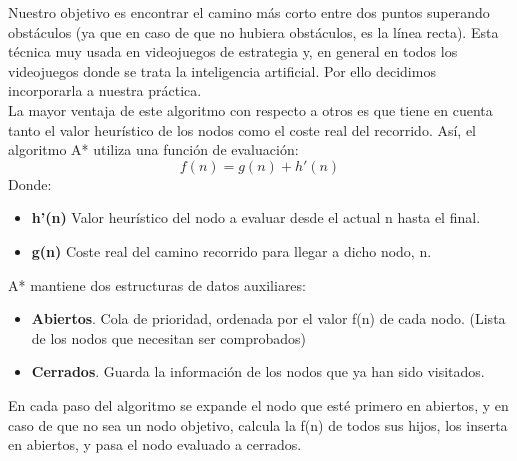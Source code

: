\documentclass[a4paper,12pt,oneside]{book}
\begin{document}
Nuestro objetivo es encontrar el camino más corto entre dos puntos
superando obstáculos (ya que en caso de que no hubiera obstáculos, es la
línea recta). Esta técnica muy usada en videojuegos de
estrategia y, en general en todos los videojuegos donde se trata la
inteligencia artificial. Por ello decidimos incorporarla a nuestra práctica.\\

La mayor ventaja de este algoritmo con respecto a otros es que tiene
en cuenta tanto el valor heurístico de los nodos como el coste real del
recorrido. Así, el algoritmo A* utiliza una función de evaluación:
$$f(n) = g(n) + h'(n) $$
Donde:
\begin {itemize}
\item {\bf h'(n)} Valor heurístico del nodo a evaluar desde el actual n
  hasta el final.
\item {\bf g(n)} Coste real del camino recorrido para llegar a dicho nodo, n.
\end {itemize}


A* mantiene dos estructuras de datos auxiliares:
\begin {itemize}
\item {\bf Abiertos}. Cola de prioridad, ordenada por el valor f(n) de
  cada nodo. (Lista de los nodos que necesitan ser comprobados)
\item {\bf Cerrados}. Guarda la información de los nodos que ya han
  sido visitados.
\end {itemize}
En cada paso del algoritmo se expande el nodo que esté primero en
abiertos, y en caso de que no sea un nodo objetivo, calcula la f(n) de
todos sus hijos, los inserta en abiertos, y pasa el nodo evaluado a cerrados.
\end{document}
